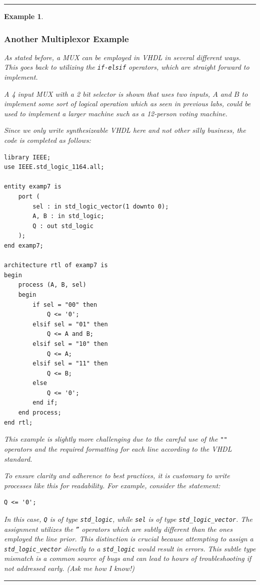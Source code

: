\documentclass[12pt]{article}
\newtheorem{example}{Example}
\newenvironment{examp}
{
	\vspace{.5cm}
	\hrule
\begin{example}\upshape}
	{\hrule
		\vspace{0.5cm}
\end{example}}
\begin{document}
\begin{examp}
	\subsubsection*{Another Multiplexor Example}
	As stated before, a MUX can be employed in VHDL in several different ways.
	This goes back to utilizing the \texttt{if-elsif} operators, which are
	straight forward to implement. 
	
	A 4 input MUX with a 2 bit selector is shown
	that uses two inputs, $A$ and $B$ to implement some sort of logical operation
	which as seen in previous labs, could be used to implement a larger machine
	such as a 12-person voting machine.
	
	Since we only write synthesizeable VHDL here and not other silly business, the
	code is completed as follows:
	\begin{verbatim}
library IEEE;
use IEEE.std_logic_1164.all;

entity examp7 is
    port (
        sel : in std_logic_vector(1 downto 0);
        A, B : in std_logic;
        Q : out std_logic
    );
end examp7;

architecture rtl of examp7 is
begin
    process (A, B, sel)
    begin
        if sel = "00" then
            Q <= '0';
        elsif sel = "01" then
            Q <= A and B;
        elsif sel = "10" then
            Q <= A;
        elsif sel = "11" then
            Q <= B;
        else 
            Q <= '0';
        end if;
    end process;
end rtl;
\end{verbatim}
	This example is slightly more challenging due to the careful use of the
	\texttt{""} operators and the required formatting for each line according to
	the VHDL standard.
	
	To ensure clarity and adherence to best practices, it is customary to write
	processes like this for readability. For example, consider the statement:
	\begin{verbatim}
Q <= '0';
\end{verbatim}
	In this case, \texttt{Q} is of type \texttt{std\_logic}, while \texttt{sel} is
	of type \texttt{std\_logic\_vector}. The assignment utilizes the \texttt{''}
	operators which are subtly different than the ones employed the line prior.
	This distinction is crucial because
	attempting to assign a \texttt{std\_logic\_vector} directly to a
	\texttt{std\_logic} would result in errors. This subtle type
	mismatch is a common source of bugs and can lead to hours of troubleshooting if
	not addressed early. (Ask me how I know!)
	

\end{examp}
\end{document}
